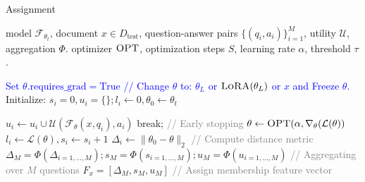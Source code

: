 \begin{algorithm}[tb]
    \footnotesize 
   \caption{\atk Assignment}
   \label{alg:assignment}
    \begin{algorithmic}[1]
        model $\mathcal{F}_{\theta_{t}}$, document $x\in D_{\text{test}}$, question-answer pairs $\{(q_i,a_i)\}_{i=1}^{M}$, utility $\mathcal{U}$, aggregation $\Phi$.
        optimizer $\textsc{OPT}$, optimization steps $S$, learning rate $\alpha$, threshold $\tau$.
    
       \State \textcolor{blue}{Set ${\theta}.\text{requires\_grad}=\text{True}$ \quad  // Change $\theta$ to: $\theta_L$ or $\textsc{LoRA}(\theta_L)$ or $x$ and Freeze $\theta$.}
       \State Initialize: $s_i = 0, u_{i} = \{\}; \mathit{l}_i \gets 0, \theta_0 \gets {\theta}_{t}$
    
       \State $u_{i} \gets u_{i} \cup \mathcal{U}({\mathcal{F}}_{\theta}(x, q_i), a_i)$
       break; \quad \textcolor{gray}{// Early stopping}
       \EndIf 
       \State ${\theta} \gets \textsc{OPT}(\alpha, \nabla_{{\theta}}(\mathcal{L}(\theta))$
       \State $\mathit{l}_i \gets \mathcal{L}(\theta), s_i \gets s_i+1$
       \EndWhile
       \State ${\Delta}_{i} \gets \lVert \theta_0-{\theta} \rVert_2$ \quad \textcolor{gray}{// Compute distance metric}
        \EndFor
       \State $\Delta_{M} = \Phi(\Delta_{i={1,\dots,M}}); s_{M}=\Phi({s}_{i={1,\dots,M}}); u_{M}=\Phi({u}_{{i={1,\dots,M}}})$ \quad \textcolor{gray}{// Aggregating over $M$ questions}
        ${F}_{x} = [\Delta_{M},s_{M},u_{M}]$  \quad \textcolor{gray}{// Assign membership feature vector}
    \end{algorithmic}
\end{algorithm}
